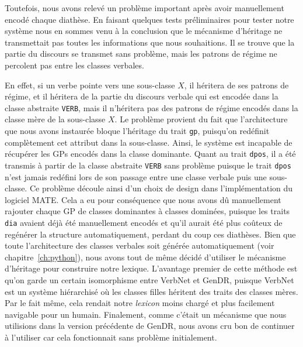 Toutefois, nous avons relevé un problème important après avoir manuellement encodé chaque diathèse. En faisant quelques tests préliminaires pour tester notre système nous en sommes venu à la conclusion que le mécanisme d'héritage ne transmettait pas toutes les informations que nous souhaitions. Il se trouve que la partie du discours se transmet sans problème, mais les patrons de régime ne percolent pas entre les classes verbales. 

En effet, si un verbe pointe vers une sous-classe $X$, il héritera de ses patrons de régime, et il héritera de la partie du discours verbale qui est encodée dans la classe abstraite \texttt{VERB}, mais il n'héritera pas des patrons de régime encodés dans la classe mère de la sous-classe $X$. Le problème provient du fait que l'architecture que nous avons instaurée bloque l'héritage du trait \texttt{gp}, puisqu'on redéfinit complètement cet attribut dans la sous-classe. Ainsi, le système est incapable de récupérer les \acp{GP} encodés dans la classe dominante. Quant au trait \texttt{dpos}, il a été transmis à partir de la classe abstraite \texttt{VERB} sans problème puisque le trait \texttt{dpos} n'est jamais redéfini lors de son passage entre une classe verbale puis une sous-classe. Ce problème découle ainsi d'un choix de design dans l'implémentation du logiciel MATE. Cela a eu pour conséquence que nous avons dû manuellement rajouter chaque \ac{GP} de classes dominantes à classes dominées, puisque les traits \texttt{dia} avaient déjà été manuellement encodés et qu'il aurait été plus coûteux de regénérer la structure automatiquement, perdant du coup ces diathèses. Bien que toute l'architecture des classes verbales soit générée automatiquement (voir chapitre~\ref{ch:python}), nous avons tout de même décidé d'utiliser le mécanisme d'héritage pour construire notre lexique. L'avantage premier de cette méthode est qu'on garde un certain isomorphisme entre VerbNet et GenDR, puisque VerbNet est un système hiérarchisé où les classes filles héritent des traits des classes mères. Par le fait même, cela rendait notre \emph{lexicon} moins chargé et plus facilement navigable pour un humain. Finalement, comme c'était un mécanisme que nous utilisions dans la version précédente de GenDR, nous avons cru bon de continuer à l'utiliser car cela fonctionnait sans problème initialement.

